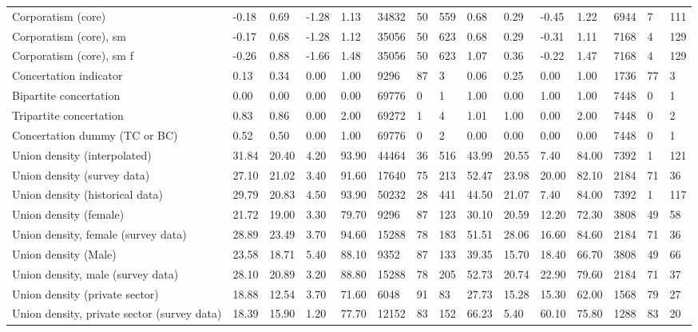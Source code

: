 \begin{longtable}{lllllllllllllll}
Corporatism (core) & -0.18 & 0.69 & -1.28 & 1.13 & 34832 & 50 & 559 & 0.68 & 0.29 & -0.45 & 1.22 & 6944 & 7 & 111\\
\addlinespace
Corporatism (core), sm & -0.17 & 0.68 & -1.28 & 1.12 & 35056 & 50 & 623 & 0.68 & 0.29 & -0.31 & 1.11 & 7168 & 4 & 129\\
Corporatism (core), sm f & -0.26 & 0.88 & -1.66 & 1.48 & 35056 & 50 & 623 & 1.07 & 0.36 & -0.22 & 1.47 & 7168 & 4 & 129\\
Concertation indicator & 0.13 & 0.34 & 0.00 & 1.00 & 9296 & 87 & 3 & 0.06 & 0.25 & 0.00 & 1.00 & 1736 & 77 & 3\\
Bipartite concertation & 0.00 & 0.00 & 0.00 & 0.00 & 69776 & 0 & 1 & 1.00 & 0.00 & 1.00 & 1.00 & 7448 & 0 & 1\\
Tripartite concertation & 0.83 & 0.86 & 0.00 & 2.00 & 69272 & 1 & 4 & 1.01 & 1.00 & 0.00 & 2.00 & 7448 & 0 & 2\\
\addlinespace
Concertation dummy (TC or BC) & 0.52 & 0.50 & 0.00 & 1.00 & 69776 & 0 & 2 & 0.00 & 0.00 & 0.00 & 0.00 & 7448 & 0 & 1\\
Union density (interpolated) & 31.84 & 20.40 & 4.20 & 93.90 & 44464 & 36 & 516 & 43.99 & 20.55 & 7.40 & 84.00 & 7392 & 1 & 121\\
Union density (survey data) & 27.10 & 21.02 & 3.40 & 91.60 & 17640 & 75 & 213 & 52.47 & 23.98 & 20.00 & 82.10 & 2184 & 71 & 36\\
Union density (historical data) & 29.79 & 20.83 & 4.50 & 93.90 & 50232 & 28 & 441 & 44.50 & 21.07 & 7.40 & 84.00 & 7392 & 1 & 117\\
Union density (female) & 21.72 & 19.00 & 3.30 & 79.70 & 9296 & 87 & 123 & 30.10 & 20.59 & 12.20 & 72.30 & 3808 & 49 & 58\\
\addlinespace
Union density, female (survey data) & 28.89 & 23.49 & 3.70 & 94.60 & 15288 & 78 & 183 & 51.51 & 28.06 & 16.60 & 84.60 & 2184 & 71 & 36\\
Union density (Male) & 23.58 & 18.71 & 5.40 & 88.10 & 9352 & 87 & 133 & 39.35 & 15.70 & 18.40 & 66.70 & 3808 & 49 & 66\\
Union density, male (survey data) & 28.10 & 20.89 & 3.20 & 88.80 & 15288 & 78 & 205 & 52.73 & 20.74 & 22.90 & 79.60 & 2184 & 71 & 37\\
Union density (private sector) & 18.88 & 12.54 & 3.70 & 71.60 & 6048 & 91 & 83 & 27.73 & 15.28 & 15.30 & 62.00 & 1568 & 79 & 27\\
Union density, private sector (survey data) & 18.39 & 15.90 & 1.20 & 77.70 & 12152 & 83 & 152 & 66.23 & 5.40 & 60.10 & 75.80 & 1288 & 83 & 20\\

\end{longtable}
